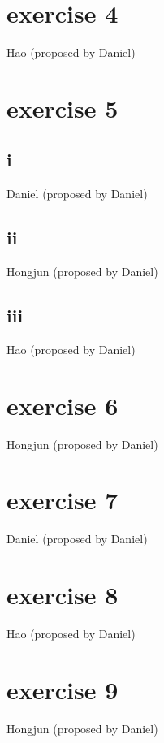 \documentclass{article}
\begin{document}
\section*{exercise 4}
Hao (proposed by Daniel)

\section*{exercise 5}
\subsection*{i}
Daniel (proposed by Daniel)
\subsection*{ii}
Hongjun (proposed by Daniel)
\subsection*{iii}
Hao (proposed by Daniel)

\section*{exercise 6}
Hongjun (proposed by Daniel)

\section*{exercise 7}
Daniel (proposed by Daniel)

\section*{exercise 8}
Hao (proposed by Daniel)

\section*{exercise 9}
Hongjun (proposed by Daniel)
\end{document}
